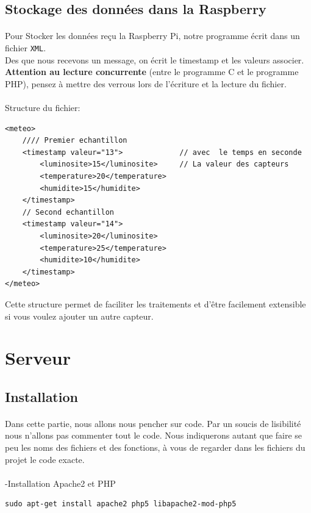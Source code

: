 \documentclass[a4paper, titlepage, oneside, 12pt]{article}%
\begin{document}
\subsection{Stockage des données dans la Raspberry}
\paragraph{}
Pour Stocker les données reçu la Raspberry Pi, notre programme écrit dans un fichier \texttt{XML}.\\
Des que nous recevons un message, on écrit le timestamp et les valeurs associer.\\
\textbf{Attention au lecture concurrente }(entre le programme C et le programme PHP), pensez à mettre des verrous lors de l’écriture et la lecture du fichier. \\
\\
Structure du fichier:
\begin{lstlisting}
<meteo>								
	//// Premier echantillon				
	<timestamp valeur="13">				// avec  le temps en seconde 
		<luminosite>15</luminosite>		// La valeur des capteurs
		<temperature>20</temperature>
		<humidite>15</humidite>
	</timestamp>		
	// Second echantillon		
	<timestamp valeur="14">					
		<luminosite>20</luminosite>
		<temperature>25</temperature>
		<humidite>10</humidite>
	</timestamp>
</meteo>
\end{lstlisting}

Cette structure permet de faciliter les traitements et d'être facilement extensible si vous voulez ajouter un autre capteur.


\section{Serveur}
\subsection{Installation}
\paragraph{}
Dans cette partie, nous allons nous pencher sur code. Par un soucis de lisibilité nous n'allons pas commenter tout le code. Nous indiquerons autant que faire se peu les noms des fichiers et des fonctions, à vous de regarder dans les fichiers du projet le code exacte.
\paragraph{}
-Installation Apache2 et PHP
\begin{lstlisting}
sudo apt-get install apache2 php5 libapache2-mod-php5
\end{lstlisting}
\end{document}
